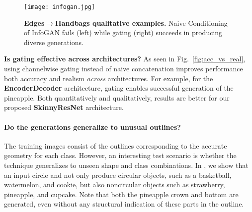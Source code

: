 
\begin{figure}[t]
    \centering
    \texttt{[image: infogan.jpg]}
    \caption{{\bf Edges$\rightarrow$Handbags qualitative examples.} Naive Conditioning of InfoGAN fails (left) while gating (right) succeeds in producing diverse generations.}\label{fig:infogan_gate}
    \vspace{-2mm}
\end{figure}

\noindent \textbf{Is gating effective across architectures?} 
As seen in Fig.~\ref{fig:acc_vs_real}, using channelwise gating instead of naive concatenation improves performance both accuracy and realism \textit{across} architectures. For example, for the \textbf{EncoderDecoder} architecture, gating enables successful generation of the pineapple.
Both quantitatively and qualitatively, results are better for our proposed \textbf{SkinnyResNet} architecture.


\paragraph{Do the generations generalize to unusual outlines?} The training images consist of the outlines corresponding to the accurate geometry for each class. However, an interesting test scenario is whether the technique generalizes to unseen shape and class combinations. In , we show that an input circle and not only produce circular objects, such as a basketball, watermelon, and cookie, but also noncircular objects such as strawberry, pineapple, and cupcake. Note that both the pineapple crown and bottom are generated, even without any structural indication of these parts in the outline.

